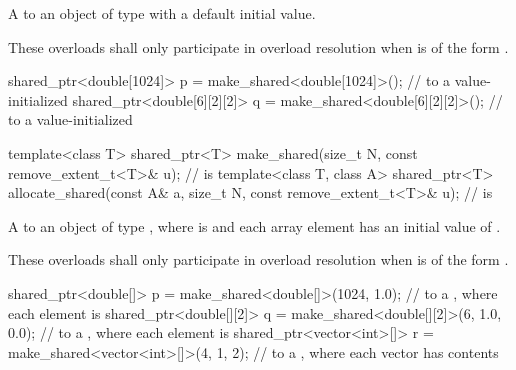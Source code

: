 \begin{itemdescr}
\pnum
\returns
A  to an object of type 
with a default initial value.

\pnum
\remarks
These overloads shall only participate in overload resolution
when  is of the form .

\pnum
\begin{example}
\begin{codeblock}
shared_ptr<double[1024]> p = make_shared<double[1024]>();
  //  to a value-initialized 
shared_ptr<double[6][2][2]> q = make_shared<double[6][2][2]>();
  //  to a value-initialized 
\end{codeblock}
\end{example}
\end{itemdescr}

%
%
\begin{itemdecl}
template<class T>
  shared_ptr<T> make_shared(size_t N,
                            const remove_extent_t<T>& u);       //  is 
template<class T, class A>
  shared_ptr<T> allocate_shared(const A& a, size_t N,
                                const remove_extent_t<T>& u);   //  is 
\end{itemdecl}

\begin{itemdescr}
\pnum
\returns
A  to an object of type ,
where  is  and
each array element has an initial value of .

\pnum
\remarks
These overloads shall only participate in overload resolution
when  is of the form .

\pnum
\begin{example}
\begin{codeblock}
shared_ptr<double[]> p = make_shared<double[]>(1024, 1.0);
  //  to a , where each element is 
shared_ptr<double[][2]> q = make_shared<double[][2]>(6, {1.0, 0.0});
  //  to a , where each  element is 
shared_ptr<vector<int>[]> r = make_shared<vector<int>[]>(4, {1, 2});
  //  to a , where each vector has contents 
\end{codeblock}
\end{example}
\end{itemdescr}

